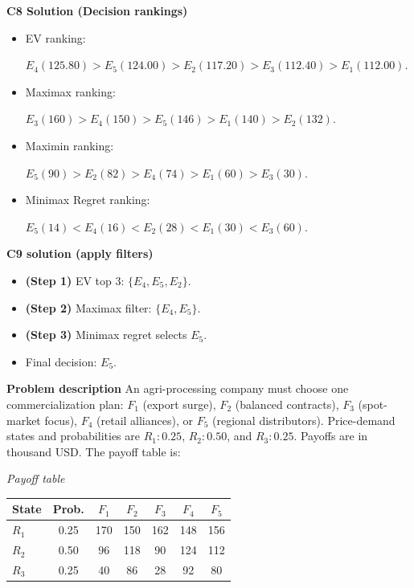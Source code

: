 \begin{ExamProblems}
		\textbf{C8 Solution (Decision rankings)}\par
		\begin{itemize}
			\item EV ranking: \par $E_4(125.80)>E_5(124.00)>E_2(117.20)>E_3(112.40)>E_1(112.00)$.
			\item Maximax ranking:\par $E_3(160)>E_4(150)>E_5(146)>E_1(140)>E_2(132)$.
			\item Maximin ranking: \par $E_5(90)>E_2(82)>E_4(74)>E_1(60)>E_3(30)$.
			\item Minimax Regret ranking:\par $E_5(14)<E_4(16)<E_2(28)<E_1(30)<E_3(60)$.
		\end{itemize}
		
		\textbf{C9 solution (apply filters)}\par
		\begin{itemize}
			\item \textbf{(Step 1)} EV top 3: $\{E_4,E_5,E_2\}$.
			\item \textbf{(Step 2)} Maximax filter: $\{E_4,E_5\}$.
			\item \textbf{(Step 3)} Minimax regret selects $E_5$.
			\item Final decision: $E_5$.
		\end{itemize}
		
		\newpage
		\item
		\textbf{Problem description}
		An agri-processing company must choose one commercialization plan: $F_1$ (export surge), $F_2$ (balanced contracts), $F_3$ (spot-market focus), $F_4$ (retail alliances), or $F_5$ (regional distributors).
		Price-demand states and probabilities are $R_1:0.25$, $R_2:0.50$, and $R_3:0.25$. Payoffs are in thousand USD. The payoff table is:
		
		\begin{center}
			\textit{Payoff table} \\
			\begin{tabular}{l c c c c c c}
				\hline
				State& Prob. & $F_1$ & $F_2$ & $F_3$ & $F_4$ & $F_5$ \\
				\hline
				$R_1$ & 0.25 & 170 & 150 & 162 & 148 & 156 \\
				$R_2$ & 0.50 & 96 & 118 & 90 & 124 & 112 \\
				$R_3$ & 0.25 & 40 & 86 & 28 & 92 & 80 \\
				\hline
			\end{tabular}
		\end{center}
		

\end{ExamProblems}
